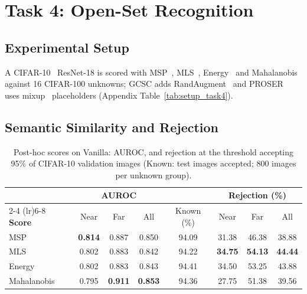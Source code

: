 \section{Task 4: Open-Set Recognition}

\subsection{Experimental Setup}
A CIFAR-10~\citep{krizhevsky2009cifar} ResNet-18 is scored with MSP~\citep{hendrycks2017msp}, MLS~\citep{vaze2022osr}, Energy~\citep{liu2020energy} and Mahalanobis~\citep{lee2018mahalanobis} against 16 CIFAR-100 unknowns; GCSC adds RandAugment~\citep{cubuk2020randaugment} and PROSER~\citep{zhou2021proser} uses mixup~\citep{verma2019manifold} placeholders (Appendix Table~\ref{tab:setup_task4}).

\subsection{Semantic Similarity and Rejection}

\begin{table}[htbp]
  \caption{Post-hoc scores on Vanilla: AUROC, and rejection at the threshold accepting 95\% of CIFAR-10 validation images (Known: test images accepted; 800 images per unknown group).}
  \label{tab:task4_posthoc}
  \centering
  \small
  \setlength{\tabcolsep}{4pt}
  \begin{tabular}{lccccccc}
    \toprule
    & \multicolumn{3}{c}{\textbf{AUROC}} & & \multicolumn{3}{c}{\textbf{Rejection (\%)}} \\
    \cmidrule(lr){2-4} \cmidrule(lr){6-8}
    \textbf{Score} & Near & Far & All & Known (\%) & Near & Far & All \\
    \midrule
    MSP         & \textbf{0.814} & 0.887 & 0.850 & 94.09 & 31.38 & 46.38 & 38.88 \\
    MLS         & 0.802 & 0.883 & 0.842 & 94.22 & \textbf{34.75} & \textbf{54.13} & \textbf{44.44} \\
    Energy      & 0.802 & 0.883 & 0.843 & 94.41 & 34.50 & 53.25 & 43.88 \\
    Mahalanobis & 0.795 & \textbf{0.911} & \textbf{0.853} & 94.36 & 27.75 & 51.38 & 39.56 \\
    \bottomrule
  \end{tabular}
\end{table}



